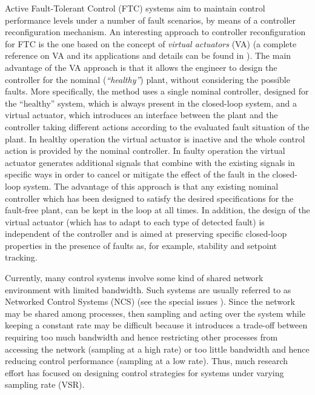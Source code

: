 \documentclass[letterpaper, 10 pt, conference]{ieeeconf}
\begin{document}
Active Fault-Tolerant Control (FTC) systems aim to maintain control
performance levels under a number of fault scenarios, by means of a
controller reconfiguration mechanism. An interesting approach to
controller reconfiguration for FTC is the one based on the concept of
\textit{virtual actuators} (VA) (a complete reference on VA and its
applications and details can be found in
\cite{steffen_controlReconfigurations,lunze_tac06,RiL09,richter_Auto11}). The
main advantage of the VA approach is that it allows the engineer to
design the controller for the nominal (\textit{``healthy''}) plant,
without considering the possible faults. More specifically, the method uses a single nominal controller, designed for the
“healthy” system, which is always present in the
closed-loop system, and a virtual actuator, which introduces an interface
between the plant and the controller taking different
actions according to the evaluated fault situation of the plant. 
In healthy operation the virtual actuator is inactive and the whole
control action is provided by the nominal controller. In faulty
operation the virtual actuator generates additional signals that
combine with the existing signals in specific ways in order to cancel
or mitigate the effect of the fault in the closed-loop system. The
advantage of this approach is that any existing nominal controller
which has been designed to satisfy the desired specifications for the
fault-free plant, can be kept in the loop at all times.
In addition, the design of the virtual actuator (which has to adapt to
each type of detected fault) is independent of the controller and is
aimed at preserving specific closed-loop properties in the presence of
faults as, for example, stability and setpoint tracking.


Currently, many control systems involve some kind of shared network
environment with limited bandwidth. Such systems are usually referred
to as Networked Control Systems (NCS) (see the special issues
\cite{antbal_tac04,antbai_pieee07}). Since the network may be shared
among processes, then sampling and acting over the system while
keeping a constant rate may be difficult because it introduces a
trade-off between requiring too much bandwidth and hence restricting
other processes from accessing the network (sampling at a high rate)
or too little bandwidth and hence reducing control performance
(sampling at a low rate). Thus, much research effort has focused on
designing control strategies for systems under varying sampling rate
(VSR).
\end{document}
